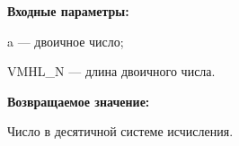 \textbf{Входные параметры:}
 
 a --- двоичное число;
 
 VMHL\_N --- длина двоичного числа.
 
\textbf{Возвращаемое значение:}

 Число в десятичной системе исчисления.